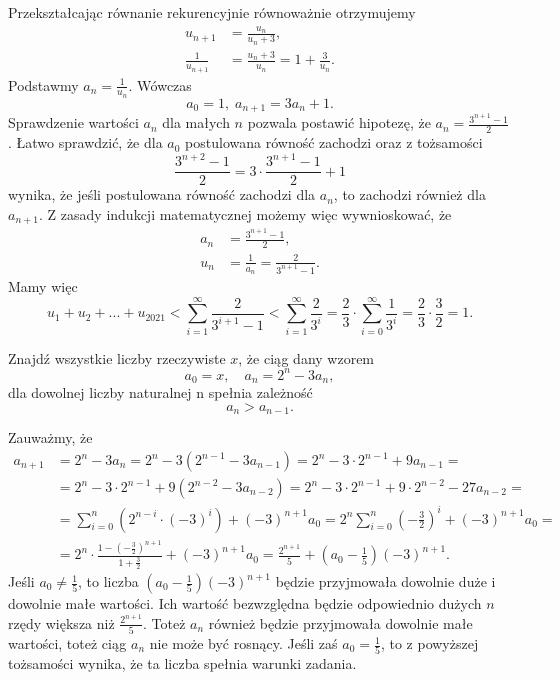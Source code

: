 \noindent
Przekształcając równanie rekurencyjnie równoważnie otrzymujemy
\begin{align*}
	u_{n + 1} &= \frac{u_n}{u_n + 3}, \\
	\frac{1}{u_{n + 1}} &= \frac{u_n + 3}{u_n} = 1 + \frac{3}{u_n}.
\end{align*}
Podstawmy $a_n = \frac{1}{u_n}$. Wówczas
\[
	a_0 = 1, \; a_{n + 1} = 3a_n + 1. 
\]
Sprawdzenie wartości $a_n$ dla małych $n$ pozwala postawić hipotezę, że $a_n = \frac{3^{n + 1} - 1}{2}$. Łatwo sprawdzić, że dla $a_0$ postulowana równość zachodzi oraz z tożsamości
\[
	\frac{3^{n + 2} - 1}{2} = 3 \cdot \frac{3^{n + 1} - 1}{2} + 1
\]
wynika, że jeśli postulowana równość zachodzi dla $a_n$, to zachodzi również dla $a_{n + 1}$. Z zasady indukcji matematycznej możemy więc wywnioskować, że
\begin{align*}
	a_{n} &= \frac{3^{n + 1} - 1}{2}, \\
	u_n &= \frac{1}{a_n} = \frac{2}{3^{n + 1} - 1}.
\end{align*}
Mamy więc
\[
	u_1 + u_2 + ... + u_{2021} < \sum^{\infty}_{i = 1} \frac{2}{3^{i + 1} - 1} < \sum^{\infty}_{i = 1} \frac{2}{3^{i}} = \frac{2}{3} \cdot \sum^{\infty}_{i = 0} \frac{1}{3^{i}} = \frac{2}{3} \cdot \frac{3}{2} = 1.
\]

\begin{problem}{4}
	Znajdź wszystkie liczby rzeczywiste $x$, że ciąg dany wzorem
	\[
		a_0 = x, \quad a_n = 2^n - 3a_n,
	\]
	dla dowolnej liczby naturalnej n spełnia zależność
	\[
		a_{n} > a_{n - 1}.
	\]
\end{problem}

\noindent
Zauważmy, że
\begin{align*}
	a_{n + 1} &= 2^n - 3a_n = 2^n - 3(2^{n - 1} - 3a_{n - 1}) = 2^n - 3 \cdot 2^{n - 1} + 9a_{n - 1} =  \\
	&= 2^n - 3 \cdot 2^{n - 1} + 9(2^{n - 2} - 3a_{n - 2}) = 2^n - 3 \cdot 2^{n - 1} + 9 \cdot 2^{n - 2} - 27a_{n - 2} = \\
	&= \sum^{n}_{i = 0} \left(2^{n - i} \cdot (-3)^i\right) + (-3)^{n + 1}a_0 = 2^n \sum^{n}_{i = 0} \left(-\frac{3}{2}\right)^i + (-3)^{n + 1}a_0 = \\
	&= 2^n \cdot \frac{1 - \left(-\frac{3}{2}\right)^{n + 1}}{1 + \frac{3}{2}} + (-3)^{n + 1}a_0 = \frac{2^{n + 1}}{5} +\left(a_0 - \frac{1}{5}\right)(-3)^{n + 1}.
\end{align*}
Jeśli $a_0 \neq \frac{1}{5}$, to liczba $\left(a_0 - \frac{1}{5}\right)(-3)^{n + 1}$ będzie przyjmowała dowolnie duże i dowolnie małe wartości. Ich wartość bezwzględna będzie odpowiednio dużych $n$ rzędy większa niż $\frac{2^{n + 1}}{5}$. Toteż $a_n$ również będzie przyjmowała dowolnie małe wartości, toteż ciąg $a_n$ nie może być rosnący. Jeśli zaś $a_0 = \frac{1}{5}$, to z powyższej tożsamości wynika, że ta liczba spełnia warunki zadania.

